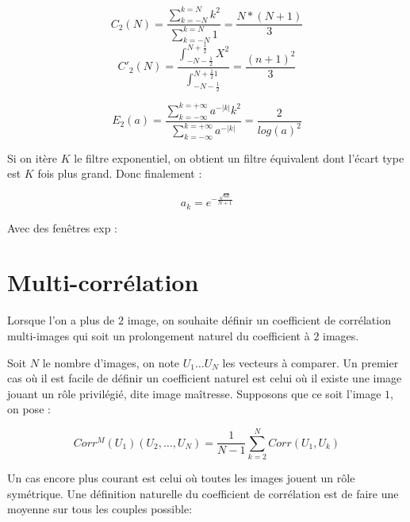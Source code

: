 \begin{equation}
    C_2(N) = \frac{\sum_{k=-N}^{k=N} k^2}{\sum_{k=-N}^{k=N}1} = \frac{N*(N+1)}{3}
\end{equation}
\begin{equation}
    C'_2(N)
      = \frac{\int_{-N-\frac{1}{2}}^{N+\frac{1}{2}} X^2}{\int_{-N-\frac{1}{2}}^{N+\frac{1}{2} 1}}
      = \frac{(n+1)^2} {3}
\end{equation}

\begin{equation}
    E_2(a)
       = \frac{\sum_{k=-\infty}^{k=+\infty} a^{-|k|}k^2}{\sum_{k=-\infty}^{k=+\infty} a^{-|k|}}
       = \frac{2}{log(a)^2}
\end{equation}

Si on it\`ere $K$ le filtre exponentiel, on obtient un filtre \'equivalent dont l'\'ecart
type est $K$ fois plus grand. Donc finalement :



\begin{equation}
   a_k = e^{-\frac{\sqrt{6k}}{N+1}}
\end{equation}


Avec des fen\^etres exp :



\section{Multi-corr\'elation}


\label{MecaGen:Multi:Correl}
Lorsque l'on a plus de $2$ image, on souhaite d\'efinir un coefficient
de corr\'elation multi-images qui soit un prolongement naturel du
coefficient \`a $2$ images.

Soit $N$ le nombre d'images, on note $U_1\dots U_N$ les vecteurs
\`a comparer. Un premier cas o\`u il est facile de d\'efinir
un coefficient  naturel est celui o\`u il existe une image  jouant
un r\^ole privil\'egi\'e, dite image ma\^itresse. Supposons
que ce soit l'image $1$, on pose :

\begin{equation}
   Corr^M(U_1)(U_2,\dots,U_N) =
    \frac{1}{N-1} \sum_{k=2}^N Corr(U_1,U_k)
   \label{Cor:Im:Maitre}
\end{equation}

Un cas encore plus courant est celui o\`u toutes les images jouent
un r\^ole sym\'etrique. Une d\'efinition naturelle du coefficient de
corr\'elation est de faire une moyenne sur tous les couples possible:

